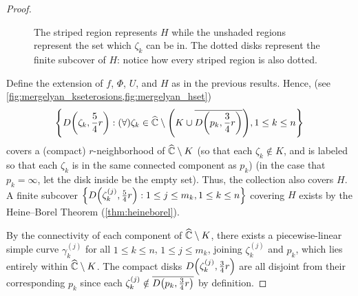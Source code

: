 \begin{proof}
\begin{figure}
        \caption{The striped region represents \(H\) while the unshaded regions represent the set which \(\zeta_k\) can be in. The dotted disks represent the finite subcover of \(H\): notice how every striped region is also dotted.}
        \label{fig:mergelyan_hset}
    \end{figure}Define the extension of \(f\), \(\Phi\), \(U\), and \(H\) as in the previous results. Hence, (see \cref{fig:mergelyan_kseterosions,fig:mergelyan_hset})
    \[\cbraces{D\qty(\zeta_k,\frac54r)}{(\forall)\zeta_k\in\extcomplex\setminus\qty(K\cup\overline{D\qty(p_k,\frac34r)}),1\leq k\leq n}\]
    covers a (compact) \(r\)-neighborhood of \(\widehat{\mathbb{C}}\setminus K\) (so that each \(\zeta_k\notin K\), and is labeled so that each \(\zeta_k\) is in the same connected component as \(p_k\)) (in the case that \(p_k=\infty\), let the disk inside be the empty set). Thus, the collection also covers \(H\). A finite subcover \(\cbraces{D\qty(\zeta^{(j)}_k,\frac54r)}{1\leq j\leq m_k,1\leq k\leq n}\) covering \(H\) exists by the Heine--Borel Theorem (\cref{thm:heineborel}).

    By the connectivity of each component of \(\widehat{\mathbb{C}}\setminus K\), there exists a piecewise-linear simple curve \(\gamma_k^{(j)}\) for all \(1\leq k\leq n\), \(1\leq j\leq m_k\), joining \(\zeta_k^{(j)}\) and \(p_k\), which lies entirely within \(\widehat{\mathbb{C}}\setminus K\). The compact disks \(D\qty(\zeta_k^{(j)},\frac34r)\) are all disjoint from their corresponding \(p_k\) since each \(\zeta_k^{(j)}\notin\overline{D\qty(p_k,\frac34r)}\) by definition.


\end{proof}
